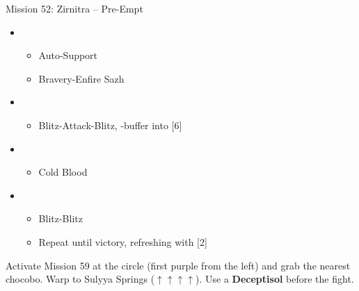 \begin{battle}{Mission 52: Zirnitra -- Pre-Empt}
	\begin{itemize}
		\item \fourth
			\begin{itemize}
				\item Auto-Support
				\item Bravery-Enfire Sazh
			\end{itemize}
		\item \third
			\begin{itemize}
				\item Blitz-Attack-Blitz, \rav-buffer into [6]
			\end{itemize}
		\item \sixth
			\begin{itemize}
				\item Cold Blood
			\end{itemize}
		\item \first
			\begin{itemize}
				\item Blitz-Blitz
				\item Repeat until victory, refreshing with [2]
			\end{itemize}
	\end{itemize}
\end{battle}

Activate Mission 59 at the circle (first purple from the left) and grab the nearest chocobo.
Warp to Sulyya Springs ($\uparrow\uparrow\uparrow\uparrow$).
Use a \textbf{Deceptisol} before the fight.

